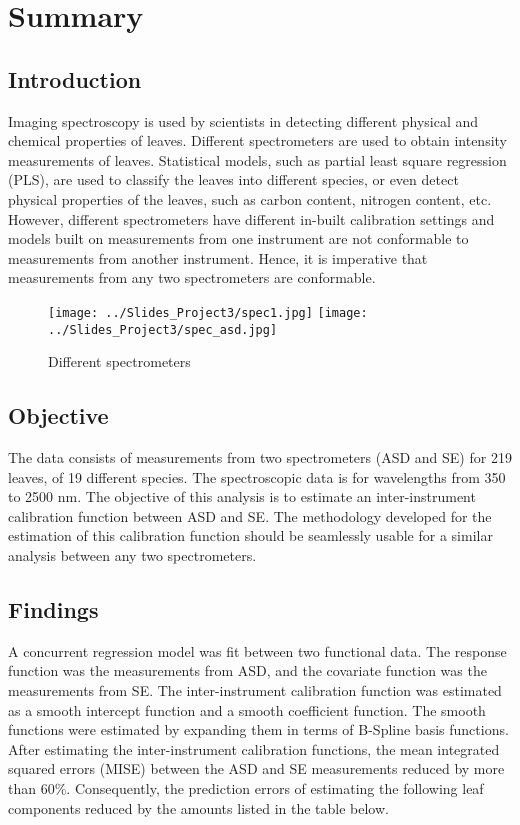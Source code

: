 \section*{Summary} \label{Sec_Summary}
\subsection*{Introduction}
Imaging spectroscopy is used by scientists in detecting different physical and chemical properties of leaves. Different spectrometers are used to obtain intensity measurements of leaves. Statistical models, such as partial least square regression (PLS), are used to classify the leaves into different species, or even detect physical properties of the leaves, such as carbon content, nitrogen content, etc. However, different spectrometers have different in-built calibration settings and models built on measurements from one instrument are not conformable to measurements from another instrument. Hence, it is imperative that measurements from any two spectrometers are conformable. 

\begin{figure}[H]
\centering
\texttt{[image: ../Slides\_Project3/spec1.jpg]}
\hspace{1cm}
\texttt{[image: ../Slides\_Project3/spec\_asd.jpg]}
\caption{Different spectrometers}
\label{fig:Fig1.1}
\end{figure}

\subsection*{Objective}
The data consists of measurements from two spectrometers (ASD and SE) for 219 leaves, of 19 different species. The spectroscopic data is for wavelengths from 350 to 2500 nm. The objective of this analysis is to estimate an inter-instrument calibration function between ASD and SE. The methodology developed for the estimation of this calibration function should be seamlessly usable for a similar analysis between any two spectrometers. 

\subsection*{Findings}
A concurrent regression model was fit between two functional data. The response function was the measurements from ASD, and the covariate function was the measurements from SE. The inter-instrument calibration function was estimated as a smooth intercept function and a smooth coefficient function. The smooth functions were estimated by expanding them in terms of B-Spline basis functions. After estimating the inter-instrument calibration functions, the mean integrated squared errors (MISE) between the ASD and SE measurements reduced by more than $60\%$. Consequently, the prediction errors of estimating the following leaf components reduced by the amounts listed in the table below. 

